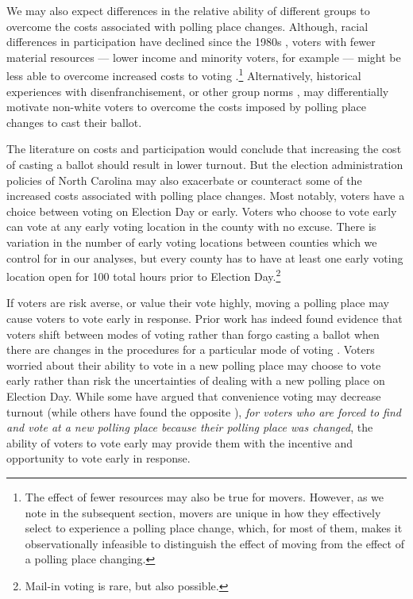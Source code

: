 \documentclass{cup_PSRM}
\begin{document}
We may also expect differences in the relative ability of different groups to overcome the costs associated with polling place changes.  Although, racial differences in participation have declined since the 1980s \citep{leighley2013votes,fraga2016candidates}, voters with fewer material resources --- lower income and minority voters, for example --- might be less able to overcome increased costs to voting \citep{verba1995voice}.\footnote{The effect of fewer resources may also be true for movers.  However, as we note in the subsequent section, movers are unique in how they effectively select to experience a polling place change, which, for most of them, makes it observationally infeasible to distinguish the effect of moving from the effect of a polling place changing.} Alternatively, historical experiences with disenfranchisement, or other group norms \citep{anollnorms}, may differentially motivate non-white voters to overcome the costs imposed by polling place changes to cast their ballot.

The literature on costs and participation would conclude that increasing the cost of casting a ballot should result in lower turnout.  But the election administration policies of North Carolina may also exacerbate or counteract some of the increased costs associated with polling place changes.  Most notably, voters have a choice between voting on Election Day or early. Voters who choose to vote early can vote at any early voting location in the county with no excuse.  There is variation in the number of early voting locations between counties which we control for in our analyses, but every county has to have at least one early voting location open for 100 total hours prior to Election Day.\footnote{Mail-in voting is rare, but also possible.}

If voters are risk averse, or value their vote highly, moving a polling place may cause voters to vote early in response.  Prior work has indeed found evidence that voters shift between modes of voting rather than forgo casting a ballot when there are changes in the procedures for a particular mode of voting \citep{michelson2012effect,malhotra2011text}.  Voters worried about their ability to vote in a new polling place may choose to vote early rather than risk the uncertainties of dealing with a new polling place on Election Day.  While some have argued that convenience voting may decrease turnout \citep{burden2014early} (while others have found the opposite \citep{gerbergreenhill2013}), \emph{for voters who are forced to find and vote at a new polling place because their polling place was changed}, the ability of voters to vote early may provide them with the incentive and opportunity to vote early in response.
\end{document}
